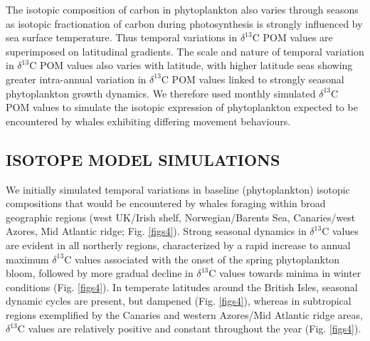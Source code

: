 \documentclass[a4paper,12pt]{article}
\begin{document}
The isotopic composition of carbon in phytoplankton also varies through seasons as isotopic fractionation of carbon during photosynthesis is strongly influenced by sea surface temperature\cite{laws1995dependence}. 
Thus temporal variations in $\delta^{13}$C POM values are superimposed on latitudinal gradients. 
The scale and nature of temporal variation in $\delta^{13}$C POM values also varies with latitude, with higher latitude seas showing greater intra-annual variation in $\delta^{13}$C POM values linked to strongly seasonal phytoplankton growth dynamics. 
We therefore used monthly simulated $\delta^{13}$C POM values to simulate the isotopic expression of phytoplankton expected to be encountered by whales exhibiting differing movement behaviours.
 
\subsection*{ISOTOPE MODEL SIMULATIONS}
We initially simulated temporal variations in baseline (phytoplankton) isotopic compositions that would be encountered by whales foraging within broad geographic regions (west UK/Irish shelf, Norwegian/Barents Sea, Canaries/west Azores, Mid Atlantic ridge; Fig. \ref{figs4}). 
Strong seasonal dynamics in $\delta^{13}$C values are evident in all northerly regions, characterized by a rapid increase to annual maximum $\delta^{13}$C values associated with the onset of the spring phytoplankton bloom, followed by more gradual decline in $\delta^{13}$C values towards minima in winter conditions (Fig. \ref{figs4}). 
In temperate latitudes around the British Isles, seasonal dynamic cycles are present, but dampened (Fig. \ref{figs4}), whereas in subtropical regions exemplified by the Canaries and western Azores/Mid Atlantic ridge areas, $\delta^{13}$C values are relatively positive and constant throughout the year (Fig. \ref{figs4}).
 
\end{document}
